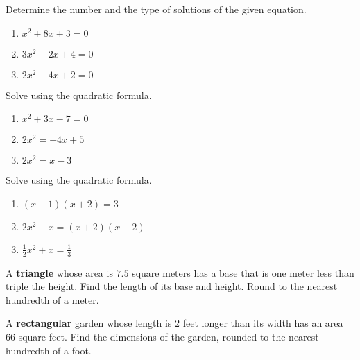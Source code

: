 \begin{exercise}

Determine the number and the type of solutions of the given equation.

\begin{enumerate}
\item
  \(x^2+8x+3=0\)
\item
  \(3x^2-2x+4=0\)
\item
  \(2x^2-4x+2=0\)
\end{enumerate}

\end{exercise}

\begin{exercise}

Solve using the quadratic formula.

\begin{enumerate}
\item
  \(x^2+3x-7=0\)
\item
  \(2x^2=-4x+5\)
\item
  \(2x^2=x-3\)
\end{enumerate}

\end{exercise}

\begin{exercise}

Solve using the quadratic formula.

\begin{enumerate}
\item
  \((x-1)(x+2)=3\)
\item
  \(2x^2-x=(x+2)(x-2)\)
\item
  \(\frac12 x^2+x= \frac13\)
\end{enumerate}

\end{exercise}

\begin{exercise}

A \textbf{triangle} whose area is \(7.5\) square meters has a base that
is one meter less than triple the height. Find the length of its base
and height. Round to the nearest hundredth of a meter.

\end{exercise}
\vspace*{5\baselineskip}

\begin{exercise}

A \textbf{rectangular} garden whose length is \(2\) feet longer than its
width has an area 66 square feet. Find the dimensions of the garden,
rounded to the nearest hundredth of a foot.

\end{exercise}

